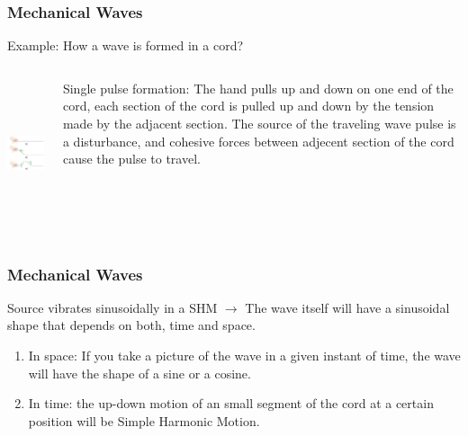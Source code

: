\documentclass[]{beamer}
\begin{document}
\begin{frame}
\frametitle{Mechanical Waves}

Example: How a wave is formed in a cord?
\vspace{5mm}

\pause


   \begin{columns}[c]
   \column{2in}  %
  
\begin{center}
  \includegraphics[height=1.7in]{images4/1.jpg}
\end{center}
\pause
   \column{2in}
Single pulse formation: The hand pulls up and down on one end of the cord, each section of the cord is pulled up and down by the tension made by the adjacent section.
The source of the traveling wave pulse is a disturbance, and cohesive forces between adjecent section of the cord cause the pulse to travel.
   \end{columns}






  \end{frame}
\begin{frame}
\frametitle{Mechanical Waves}


Source vibrates sinusoidally in a SHM $\rightarrow$ The wave itself will have a sinusoidal shape that depends on both,  time and space. 
\pause
\vspace{5mm}

\begin{enumerate}
\item In space: If you take a picture of the wave in a given instant of time, the wave will have the shape of a sine or a cosine.
\pause
\item In time: the up-down motion of  an small segment  of  the cord at a certain position will be Simple Harmonic Motion.

\end{enumerate}

  \end{frame}
\end{document}
